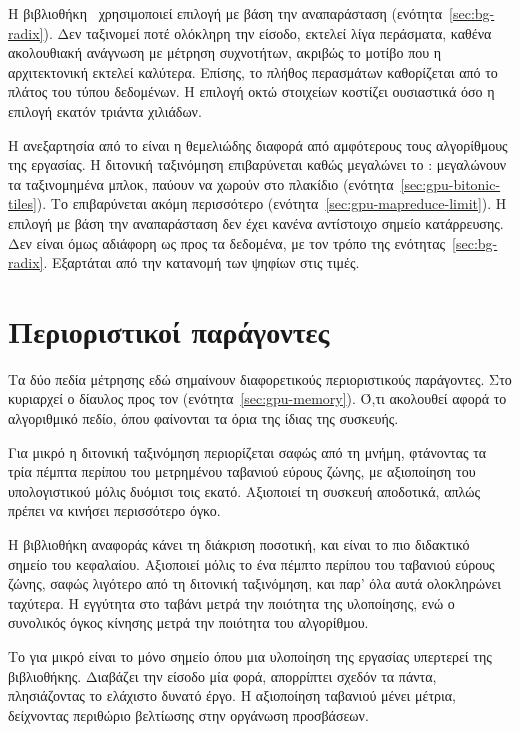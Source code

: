 Η βιβλιοθήκη~\cite{cccl} χρησιμοποιεί επιλογή με βάση την αναπαράσταση
(ενότητα~\ref{sec:bg-radix}). Δεν ταξινομεί ποτέ ολόκληρη την είσοδο, εκτελεί
λίγα περάσματα, καθένα ακολουθιακή ανάγνωση με μέτρηση συχνοτήτων, ακριβώς το
μοτίβο που η αρχιτεκτονική εκτελεί καλύτερα. Επίσης, το πλήθος περασμάτων
καθορίζεται από το πλάτος του τύπου δεδομένων. Η επιλογή οκτώ στοιχείων
κοστίζει ουσιαστικά όσο η επιλογή εκατόν τριάντα χιλιάδων.

Η ανεξαρτησία από το  είναι η θεμελιώδης διαφορά από αμφότερους τους
αλγορίθμους της εργασίας. Η διτονική ταξινόμηση επιβαρύνεται καθώς μεγαλώνει το
: μεγαλώνουν τα ταξινομημένα μπλοκ, παύουν να χωρούν στο πλακίδιο
(ενότητα~\ref{sec:gpu-bitonic-tiles}). Το  επιβαρύνεται ακόμη
περισσότερο (ενότητα~\ref{sec:gpu-mapreduce-limit}). Η επιλογή με βάση την
αναπαράσταση δεν έχει κανένα αντίστοιχο σημείο κατάρρευσης. Δεν είναι όμως
αδιάφορη ως προς τα δεδομένα, με τον τρόπο της ενότητας~\ref{sec:bg-radix}.
Εξαρτάται από την κατανομή των ψηφίων στις τιμές.

\section{Περιοριστικοί παράγοντες}
\label{sec:gpu-bottlenecks}

Τα δύο πεδία μέτρησης εδώ σημαίνουν διαφορετικούς περιοριστικούς παράγοντες.
Στο  κυριαρχεί ο δίαυλος προς τον 
(ενότητα~\ref{sec:gpu-memory}). Ό,τι ακολουθεί αφορά το αλγοριθμικό πεδίο, όπου
φαίνονται τα όρια της ίδιας της συσκευής.

Για μικρό  η διτονική ταξινόμηση περιορίζεται σαφώς από τη μνήμη,
φτάνοντας τα τρία πέμπτα περίπου του μετρημένου ταβανιού εύρους ζώνης, με
αξιοποίηση του υπολογιστικού μόλις δυόμισι τοις εκατό. Αξιοποιεί τη συσκευή
αποδοτικά, απλώς πρέπει να κινήσει περισσότερο όγκο.

Η βιβλιοθήκη αναφοράς κάνει τη διάκριση ποσοτική, και είναι το πιο διδακτικό
σημείο του κεφαλαίου. Αξιοποιεί μόλις το ένα πέμπτο περίπου του ταβανιού εύρους
ζώνης, σαφώς λιγότερο από τη διτονική ταξινόμηση, και παρ' όλα αυτά ολοκληρώνει
ταχύτερα. Η εγγύτητα στο ταβάνι μετρά την ποιότητα της υλοποίησης, ενώ ο
συνολικός όγκος κίνησης μετρά την ποιότητα του αλγορίθμου.

Το  για μικρό  είναι το μόνο σημείο όπου μια υλοποίηση της
εργασίας υπερτερεί της βιβλιοθήκης. Διαβάζει την είσοδο μία φορά, απορρίπτει
σχεδόν τα πάντα, πλησιάζοντας το ελάχιστο δυνατό έργο. Η αξιοποίηση ταβανιού
μένει μέτρια, δείχνοντας περιθώριο βελτίωσης στην οργάνωση προσβάσεων.

